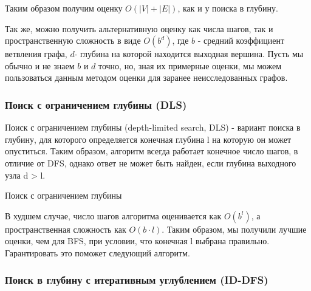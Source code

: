 Таким образом получим оценку $O(|V| + |E|)$, как и у поиска в глубину.

Так же, можно получить альтернативную оценку как числа шагов, так и пространственную сложность в виде $O(b^{d})$, где $b$ - средний коэффициент ветвления графа, $d$- глубина на которой находится выходная вершина. Пусть мы обычно и не знаем $b$ и $d$ точно, но, зная их примерные оценки, мы можем пользоваться данным методом оценки для заранее неисследованных графов.

\subsubsection{Поиск с ограничением глубины (DLS)} \label{DLS-algo}

Поиск с ограничением глубины (depth-limited search, DLS) - вариант поиска в глубину, для которого определяется конечная глубина l на которую он может опуститься. Таким образом, алгоритм всегда работает конечное число шагов, в отличие от DFS, однако ответ не может быть найден, если глубина выходного узла d > l.

\begin{algorithm}[H]
\SetAlgoLined
{}

\caption{Поиск с ограничением глубины} 
\label{algo:DLS}
\end{algorithm}

В худшем случае, число шагов алгоритма оценивается как $O(b^l)$, а пространственная сложность как $O(b \cdot l)$. Таким образом, мы получили лучшие оценки, чем для BFS, при условии, что конечная l выбрана правильно. Гарантировать это поможет следующий алгоритм.

\subsubsection{Поиск в глубину с итеративным углублением (ID-DFS)} \label{ID-DFS-algo}

